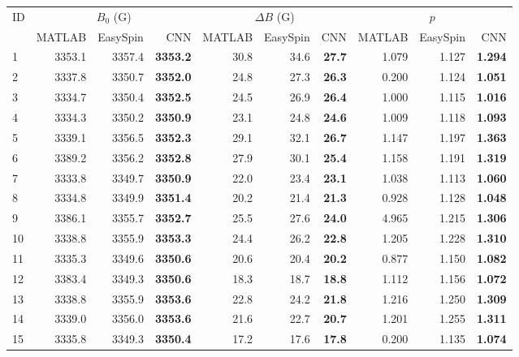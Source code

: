 \documentclass[a4paper,11pt]{article}
\begin{document}
\begin{longtable}{l rrr rrr rrr}
\toprule
ID & \multicolumn{3}{c}{$B_0$ (G)} & \multicolumn{3}{c}{$\Delta B$ (G)} & \multicolumn{3}{c}{$p$} \\
\cmidrule(lr){2-4} \cmidrule(lr){5-7} \cmidrule(lr){8-10}
 & MATLAB & EasySpin & CNN & MATLAB & EasySpin & CNN & MATLAB & EasySpin & CNN \\
\midrule
\endhead
  1 & 3353.1 & 3357.4 & \textbf{3353.2} & 30.8 & 34.6 & \textbf{27.7} & 1.079 & 1.127 & \textbf{1.294} \\
  2 & 3337.8 & 3350.7 & \textbf{3352.0} & 24.8 & 27.3 & \textbf{26.3} & 0.200 & 1.124 & \textbf{1.051} \\
  3 & 3334.7 & 3350.4 & \textbf{3352.5} & 24.5 & 26.9 & \textbf{26.4} & 1.000 & 1.115 & \textbf{1.016} \\
  4 & 3334.3 & 3350.2 & \textbf{3350.9} & 23.1 & 24.8 & \textbf{24.6} & 1.009 & 1.118 & \textbf{1.093} \\
  5 & 3339.1 & 3356.5 & \textbf{3352.3} & 29.1 & 32.1 & \textbf{26.7} & 1.147 & 1.197 & \textbf{1.363} \\
  6 & 3389.2 & 3356.2 & \textbf{3352.8} & 27.9 & 30.1 & \textbf{25.4} & 1.158 & 1.191 & \textbf{1.319} \\
  7 & 3333.8 & 3349.7 & \textbf{3350.9} & 22.0 & 23.4 & \textbf{23.1} & 1.038 & 1.113 & \textbf{1.060} \\
  8 & 3334.8 & 3349.9 & \textbf{3351.4} & 20.2 & 21.4 & \textbf{21.3} & 0.928 & 1.128 & \textbf{1.048} \\
  9 & 3386.1 & 3355.7 & \textbf{3352.7} & 25.5 & 27.6 & \textbf{24.0} & 4.965 & 1.215 & \textbf{1.306} \\
  10 & 3338.8 & 3355.9 & \textbf{3353.3} & 24.4 & 26.2 & \textbf{22.8} & 1.205 & 1.228 & \textbf{1.310} \\
  11 & 3335.3 & 3349.6 & \textbf{3350.6} & 20.6 & 20.4 & \textbf{20.2} & 0.877 & 1.150 & \textbf{1.082} \\
  12 & 3383.4 & 3349.3 & \textbf{3350.6} & 18.3 & 18.7 & \textbf{18.8} & 1.112 & 1.156 & \textbf{1.072} \\
  13 & 3338.8 & 3355.9 & \textbf{3353.6} & 22.8 & 24.2 & \textbf{21.8} & 1.216 & 1.250 & \textbf{1.309} \\
  14 & 3339.0 & 3356.0 & \textbf{3353.6} & 21.6 & 22.7 & \textbf{20.7} & 1.201 & 1.255 & \textbf{1.311} \\
  15 & 3335.8 & 3349.3 & \textbf{3350.4} & 17.2 & 17.6 & \textbf{17.8} & 0.200 & 1.135 & \textbf{1.074} \\

\end{longtable}
\end{document}
